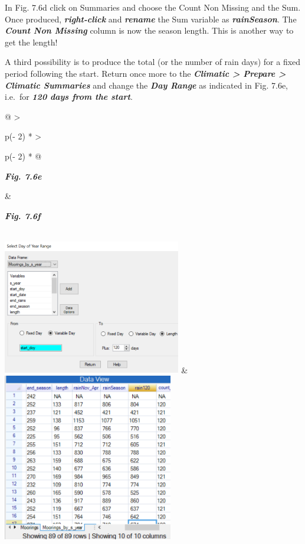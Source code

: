 \documentclass[
  letterpaper,
  DIV=11,
  numbers=noendperiod]{scrreprt}
\begin{document}
In Fig. 7.6d click on Summaries and choose the Count Non Missing and the
Sum. Once produced, \textbf{\emph{right-click}} and
\textbf{\emph{rename}} the Sum variable as \textbf{\emph{rainSeason}}.
The \textbf{\emph{Count Non Missing}} column is now the season length.
This is another way to get the length!

A third possibility is to produce the total (or the number of rain days)
for a fixed period following the start. Return once more to the
\textbf{\emph{Climatic \textgreater{} Prepare \textgreater{} Climatic
Summaries}} and change the \textbf{\emph{Day Range}} as indicated in
Fig. 7.6e, i.e.~for \textbf{\emph{120 days from the start}}.

\begin{longtable}[]{@{}
  >{\raggedright\arraybackslash}p{(\columnwidth - 2\tabcolsep) * }
  >{\raggedright\arraybackslash}p{(\columnwidth - 2\tabcolsep) * }@{}}
\toprule\noalign{}
\begin{minipage}[b]{\linewidth}\raggedright
\textbf{\emph{Fig. 7.6e}}
\end{minipage} & \begin{minipage}[b]{\linewidth}\raggedright
\textbf{\emph{Fig. 7.6f}}
\end{minipage} \\
\midrule\noalign{}
\endhead
\bottomrule\noalign{}
\endlastfoot
\includegraphics[width=3.06766in,height=2.31779in]{figures/Fig7.6e.png}
&
\includegraphics[width=2.92924in,height=2.88679in]{figures/Fig7.6f.png} \\
\end{longtable}
\end{document}
